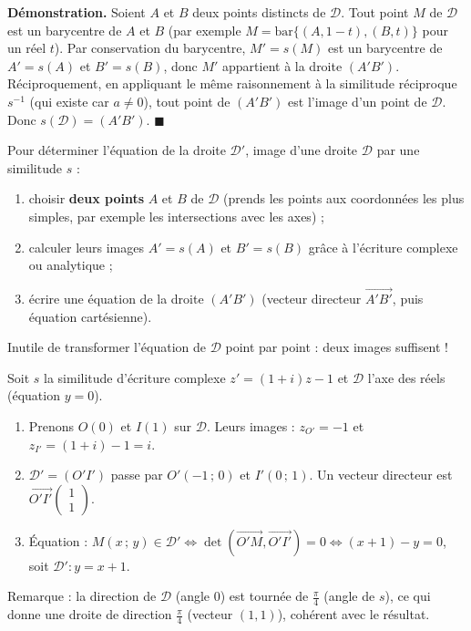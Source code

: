 \documentclass[11pt]{article}
\begin{document}
\textbf{Démonstration.} Soient $A$ et $B$ deux points distincts de $\mathcal{D}$. Tout point $M$ de $\mathcal{D}$ est un barycentre de $A$ et $B$ (par exemple $M = \text{bar}\{(A, 1-t), (B, t)\}$ pour un réel $t$). Par conservation du barycentre, $M' = s(M)$ est un barycentre de $A' = s(A)$ et $B' = s(B)$, donc $M'$ appartient à la droite $(A'B')$. Réciproquement, en appliquant le même raisonnement à la similitude réciproque $s^{-1}$ (qui existe car $a \neq 0$), tout point de $(A'B')$ est l'image d'un point de $\mathcal{D}$. Donc $s(\mathcal{D}) = (A'B')$. \hfill $\blacksquare$

\begin{methode}
Pour déterminer l'équation de la droite $\mathcal{D}'$, image d'une droite $\mathcal{D}$ par une similitude $s$ :
\begin{enumerate}
\item choisir \textbf{deux points} $A$ et $B$ de $\mathcal{D}$ (prends les points aux coordonnées les plus simples, par exemple les intersections avec les axes) ;
\item calculer leurs images $A' = s(A)$ et $B' = s(B)$ grâce à l'écriture complexe ou analytique ;
\item écrire une équation de la droite $(A'B')$ (vecteur directeur $\overrightarrow{A'B'}$, puis équation cartésienne).
\end{enumerate}
Inutile de transformer l'équation de $\mathcal{D}$ point par point : deux images suffisent !
\end{methode}

\begin{exemplebox}
Soit $s$ la similitude d'écriture complexe $z' = (1+i)z - 1$ et $\mathcal{D}$ l'axe des réels (équation $y = 0$).
\begin{enumerate}
\item Prenons $O(0)$ et $I(1)$ sur $\mathcal{D}$. Leurs images : $z_{O'} = -1$ et $z_{I'} = (1+i) - 1 = i$.
\item $\mathcal{D}' = (O'I')$ passe par $O'(-1\,;\,0)$ et $I'(0\,;\,1)$. Un vecteur directeur est $\overrightarrow{O'I'}\begin{pmatrix} 1 \\ 1 \end{pmatrix}$.
\item Équation : $M(x\,;\,y) \in \mathcal{D}' \iff \det(\overrightarrow{O'M}, \overrightarrow{O'I'}) = 0 \iff (x+1) - y = 0$, soit $\mathcal{D}' : y = x + 1$.
\end{enumerate}
Remarque : la direction de $\mathcal{D}$ (angle $0$) est tournée de $\frac{\pi}{4}$ (angle de $s$), ce qui donne une droite de direction $\frac{\pi}{4}$ (vecteur $(1,1)$), cohérent avec le résultat.
\end{exemplebox}
\end{document}
